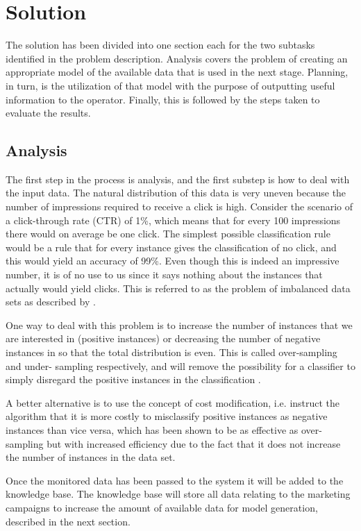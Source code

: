 \documentclass[10pt,twocolumn]{article}
\begin{document}
\section{Solution}
The solution has been divided into one section each for the two subtasks identified in the problem description. Analysis covers the problem of creating an appropriate model of the available data that is used in the next stage. Planning, in turn, is the utilization of that model with the purpose of outputting useful information to the operator. Finally, this is followed by the steps taken to evaluate the results.

\subsection{Analysis}
The first step in the process is analysis, and the first substep is how to deal with the input data. The natural distribution of this data is very uneven because the number of impressions required to receive a click is high. Consider the scenario of a click-through rate (CTR) of 1\%, which means that for every 100 impressions there would on average be one click. The simplest possible classification rule would be a rule that for every instance gives the classification of no click, and this would yield an accuracy of 99\%. Even though this is indeed an impressive number, it is of no use to us since it says nothing about the instances that actually would yield clicks. This is referred to as the problem of imbalanced data sets as described by \citet{Chawla2004}.

One way to deal with this problem is to increase the number of instances that we are interested in (positive instances) or decreasing the number of negative instances in so that the total distribution is even. This is called over-sampling and under- sampling respectively, and will remove the possibility for a classifier to simply disregard the positive instances in the classification \citep{Chawla2004, Japkowicz2002}.

A better alternative is to use the concept of cost modification, i.e. instruct the algorithm that it is more costly to misclassify positive instances as negative instances than vice versa, which has been shown to be as effective as over-sampling but with increased efficiency \citep{Chawla2004, Japkowicz2002} due to the fact that it does not increase the number of instances in the data set.

Once the monitored data has been passed to the system it will be added to the knowledge base. The knowledge base will store all data relating to the marketing campaigns to increase the amount of available data for model generation, described in the next section.
\end{document}

